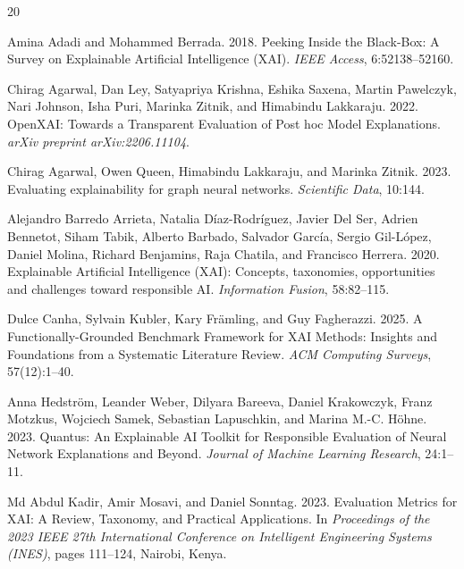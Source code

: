 \documentclass[twoside,11pt]{article}
\begin{document}
\clearpage
{}
{}
\begin{thebibliography}{20}

Amina Adadi and Mohammed Berrada.
2018.
Peeking Inside the Black-Box: A Survey on Explainable Artificial Intelligence (XAI).
\emph{IEEE Access}, 6:52138--52160.

Chirag Agarwal, Dan Ley, Satyapriya Krishna, Eshika Saxena, Martin Pawelczyk,
Nari Johnson, Isha Puri, Marinka Zitnik, and Himabindu Lakkaraju.
2022.
OpenXAI: Towards a Transparent Evaluation of Post hoc Model Explanations.
\emph{arXiv preprint arXiv:2206.11104}.

Chirag Agarwal, Owen Queen, Himabindu Lakkaraju, and Marinka Zitnik.
2023.
Evaluating explainability for graph neural networks.
\emph{Scientific Data}, 10:144.

Alejandro Barredo Arrieta, Natalia D\'iaz-Rodr\'iguez, Javier Del Ser,
Adrien Bennetot, Siham Tabik, Alberto Barbado, Salvador Garc\'ia,
Sergio Gil-L\'opez, Daniel Molina, Richard Benjamins, Raja Chatila,
and Francisco Herrera.
2020.
Explainable Artificial Intelligence (XAI): Concepts, taxonomies, opportunities and challenges toward responsible AI.
\emph{Information Fusion}, 58:82--115.

Dulce Canha, Sylvain Kubler, Kary Fr\"amling, and Guy Fagherazzi.
2025.
A Functionally-Grounded Benchmark Framework for XAI Methods: Insights and
Foundations from a Systematic Literature Review.
\emph{ACM Computing Surveys}, 57(12):1--40.


Anna Hedstr\"om, Leander Weber, Dilyara Bareeva, Daniel Krakowczyk,
Franz Motzkus, Wojciech Samek, Sebastian Lapuschkin, and Marina M.-C. H\"ohne.
2023.
Quantus: An Explainable AI Toolkit for Responsible Evaluation of Neural Network Explanations and Beyond.
\emph{Journal of Machine Learning Research}, 24:1--11.

Md Abdul Kadir, Amir Mosavi, and Daniel Sonntag.
2023.
Evaluation Metrics for XAI: A Review, Taxonomy, and Practical Applications.
In \emph{Proceedings of the 2023 IEEE 27th International Conference on
Intelligent Engineering Systems (INES)}, pages 111--124, Nairobi, Kenya.


\end{thebibliography}
\end{document}
